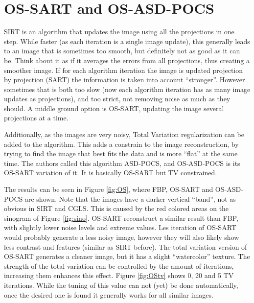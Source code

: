 \documentclass[11pt]{report}
\begin{document}
\FloatBarrier

\chapter*{OS-SART and OS-ASD-POCS}
SIRT is an algorithm that updates the image using all the projections in one step. While faster (as each iteration is a single image update), this generally leads to an image that is sometimes too smooth, but definitely not as good as it can be. Think about it as if it averages the errors from all projections, thus creating a smoother image. If for each algorithm iteration the image is updated projection by projection (SART) the information is taken into account ``stronger''. However sometimes that is  both too slow (now each algorithm iteration has as many image updates as projections), and too strict, not removing noise as much as they should. A middle ground option is OS-SART, updating the image several projections at a time. 

Additionally, as the images are very noisy, Total Variation regularization can be added to the algorithm. This adds a constrain to the image reconstruction, by trying to find the image that best fits the data and is more ``flat'' at the same time. The authors called this algorithm ASD-POCS, and OS-ASD-POCS is its OS-SART variation of it. It is basically OS-SART but TV constrained.

The results can be seen in Figure \ref{fig:OS}, where FBP, OS-SART and OS-ASD-POCS are shown. Note that the images have a darker vertical ``band'', not as obvious in SIRT and CGLS. This is caused by the red colored areas on the sinogram of Figure \ref{fig:sino}. OS-SART reconstruct a similar result than FBP, with slightly lower noise levels and extreme values. Les iteration of OS-SART would probably generate a less noisy image, however they will also likely show less contrast and features (similar as SIRT before). The total variation version of OS-SART generates a cleaner image, but it has a slight ``watercolor'' texture. The strength of the total variation can be controlled by the amount of iterations, increasing them enhances this effect. Figure \ref{fig:OStv} shows 0, 20 and 5 TV iterations. While the tuning of this value can not (yet) be done automatically, once the desired one is found it generally works for all similar images.
\end{document}

